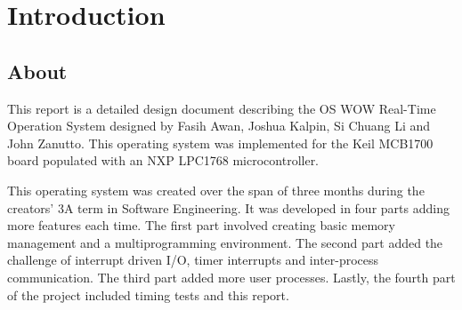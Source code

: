 \documentclass[se]{uw-wkrpt}
\begin{document}
\frontmatter


\setcounter{tocdepth}{1}

\tableofcontents

\mainmatter

\section{Introduction}\label{sec:intro}

\subsection{About}

This report is a detailed design document describing the OS WOW Real-Time Operation System designed by Fasih Awan, Joshua Kalpin, Si Chuang Li and John Zanutto. This operating system was implemented for the Keil MCB1700 board populated with an NXP LPC1768 microcontroller. 

This operating system was created over the span of three months during the creators' 3A term in Software Engineering. It was developed in four parts adding more features each time. The first part involved creating basic memory management and a multiprogramming environment. The second part added the challenge of interrupt driven I/O, timer interrupts and inter-process communication. The third part added more user processes. Lastly, the fourth part of the project included timing tests and this report.
\end{document}

